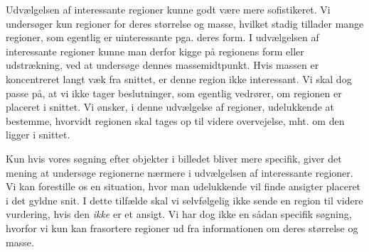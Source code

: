 Udvælgelsen af interessante regioner kunne godt være mere
sofistikeret.  Vi undersøger kun regioner for deres størrelse og masse,
hvilket stadig tillader mange regioner, som egentlig er uinteressante
pga. deres form.  I udvælgelsen af interessante regioner kunne man
derfor kigge på regionens form eller udstrækning, ved at undersøge
dennes massemidtpunkt.  Hvis massen er koncentreret langt væk fra
snittet, er denne region ikke interessant. Vi skal dog passe på, at vi
ikke tager beslutninger, som egentlig vedrører, om regionen er placeret
i snittet. Vi ønsker, i denne udvælgelse af regioner, udelukkende at
bestemme, hvorvidt regionen skal tages op til videre overvejelse, mht.
om den ligger i snittet.

Kun hvis vores søgning efter objekter i billedet bliver mere specifik,
giver det mening at undersøge regionerne nærmere i udvælgelsen af
interessante regioner. Vi kan forestille os en situation, hvor man
udelukkende vil finde ansigter placeret i det gyldne snit. I dette
tilfælde skal vi selvfølgelig ikke sende en region til videre
vurdering, hvis den \emph{ikke} er et ansigt. Vi har dog ikke en sådan
specifik søgning, hvorfor vi kun kan frasortere regioner ud fra
informationen om deres størrelse og masse.


